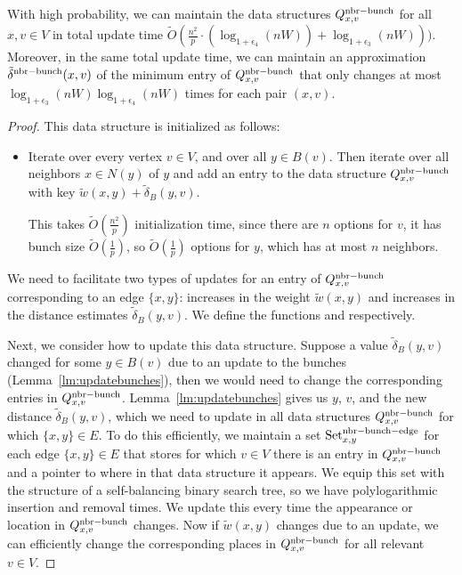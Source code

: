 \begin{lemma}\label{lm:NbrBunchDS}
    With high probability, we can maintain the data structures $Q^{\rm{nbr-bunch}}_{x,v}$ for all $x,v\in V$ in total update time $ \tilde O (\tfrac{n^2}{p}\cdot (\log_{1+\epsilon_4}(nW))+\log_{1+\epsilon_3}(nW))) $. Moreover, in the same total update time, we can maintain an approximation $\tilde\delta^{\rm{nbr-bunch}}(x,v)$ of the minimum entry of $Q^{\rm{nbr-bunch}}_{x,v}$ that only changes at most $\log_{1+\epsilon_3}(nW)\log_{1+\epsilon_4}(nW)$ times for each pair $(x,v)$.
\end{lemma}
\begin{proof}
    This data structure is initialized as follows:
    \begin{itemize}
        \item Iterate over every vertex $v\in V$, and over all $y\in B(v)$. Then iterate over all neighbors $x\in N(y)$ of $y$ and add an entry to the data structure $Q^{\rm{nbr-bunch}}_{x,v}$ with key $\tilde{w}(x,y) + \tilde \delta_B(y,v)$.
    
        This takes $ \tilde O (\tfrac{n^2}{p}) $ initialization time, since there are $n$ options for $v$, it has bunch size $\tilde O(\tfrac{1}{p})$, so $\tilde O(\tfrac{1}{p})$ options for $y$, which has at most $n$ neighbors. 
    \end{itemize}
    We need to facilitate two types of updates for an entry of $Q^{\rm{nbr-bunch}}_{x,v}$ corresponding to an edge $\{x,y\}$: increases in the weight $\tilde w(x,y)$ and increases in the distance estimates $\tilde\delta_B(y,v)$. We define the functions \UpdateNbrBunchDSEdgeChange and \UpdateNbrBunchDSBunchChange respectively. 
    
    Next, we consider how to update this data structure. Suppose a value $\tilde\delta_B(y,v)$ changed for some $y\in B(v)$ due to an update to the bunches (Lemma~\ref{lm:updatebunches}), then we would need to change the corresponding entries in $Q^{\rm{nbr-bunch}}_{x,v}$. Lemma~\ref{lm:updatebunches} gives us $y$, $v$, and the new distance $\tilde \delta_B(y,v)$, which we need to update in all data structures $Q^{\rm{nbr-bunch}}_{x,v}$ for which $\{x,y\}\in E$. To do this efficiently, we maintain a set $\text{Set}_{x,y}^{\rm{nbr-bunch-edge}}$ for each edge $\{x,y\}\in E$ that stores for which $v\in V$ there is an entry in $Q^{\rm{nbr-bunch}}_{x,v}$ and a pointer to where in that data structure it appears. We equip this set with the structure of a self-balancing binary search tree, so we have polylogarithmic insertion and removal times. We update this every time the appearance or location in $Q^{\rm{nbr-bunch}}_{x,v}$ changes. Now if $\tilde w(x,y)$ changes due to an update, we can efficiently change the corresponding places in $Q^{\rm{nbr-bunch}}_{x,v}$ for all relevant $v\in V$.
    

\end{proof}
